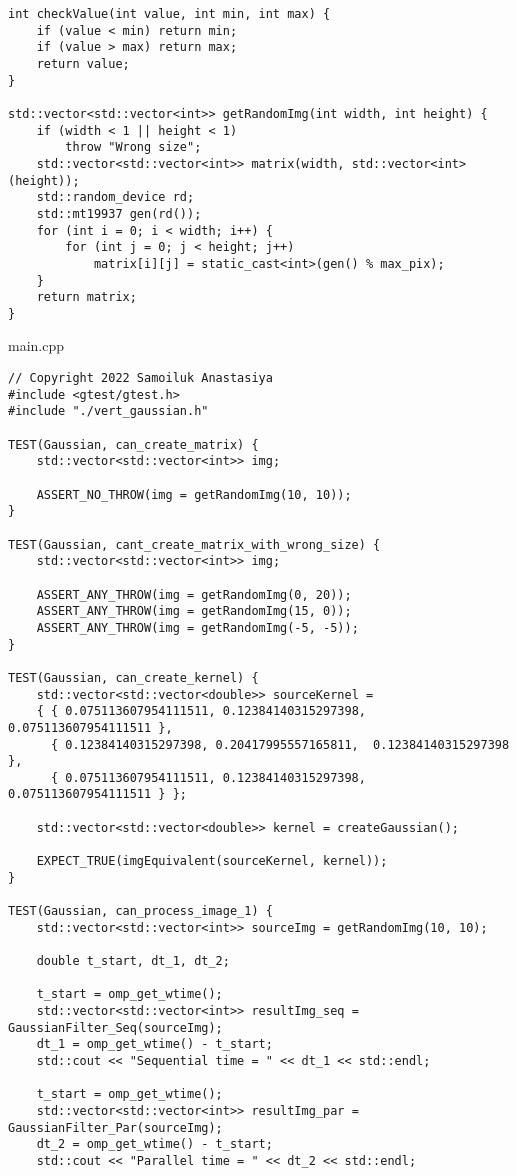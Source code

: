 \documentclass{report}
\begin{document}
\begin{lstlisting}
int checkValue(int value, int min, int max) {
    if (value < min) return min;
    if (value > max) return max;
    return value;
}

std::vector<std::vector<int>> getRandomImg(int width, int height) {
    if (width < 1 || height < 1)
        throw "Wrong size";
    std::vector<std::vector<int>> matrix(width, std::vector<int>(height));
    std::random_device rd;
    std::mt19937 gen(rd());
    for (int i = 0; i < width; i++) {
        for (int j = 0; j < height; j++)
            matrix[i][j] = static_cast<int>(gen() % max_pix);
    }
    return matrix;
}
\end{lstlisting}
\par main.cpp
\begin{lstlisting}
// Copyright 2022 Samoiluk Anastasiya
#include <gtest/gtest.h>
#include "./vert_gaussian.h"

TEST(Gaussian, can_create_matrix) {
    std::vector<std::vector<int>> img;

    ASSERT_NO_THROW(img = getRandomImg(10, 10));
}

TEST(Gaussian, cant_create_matrix_with_wrong_size) {
    std::vector<std::vector<int>> img;

    ASSERT_ANY_THROW(img = getRandomImg(0, 20));
    ASSERT_ANY_THROW(img = getRandomImg(15, 0));
    ASSERT_ANY_THROW(img = getRandomImg(-5, -5));
}

TEST(Gaussian, can_create_kernel) {
    std::vector<std::vector<double>> sourceKernel =
    { { 0.075113607954111511, 0.12384140315297398, 0.075113607954111511 },
      { 0.12384140315297398, 0.20417995557165811,  0.12384140315297398 },
      { 0.075113607954111511, 0.12384140315297398, 0.075113607954111511 } };

    std::vector<std::vector<double>> kernel = createGaussian();

    EXPECT_TRUE(imgEquivalent(sourceKernel, kernel));
}

TEST(Gaussian, can_process_image_1) {
    std::vector<std::vector<int>> sourceImg = getRandomImg(10, 10);

    double t_start, dt_1, dt_2;

    t_start = omp_get_wtime();
    std::vector<std::vector<int>> resultImg_seq = GaussianFilter_Seq(sourceImg);
    dt_1 = omp_get_wtime() - t_start;
    std::cout << "Sequential time = " << dt_1 << std::endl;

    t_start = omp_get_wtime();
    std::vector<std::vector<int>> resultImg_par = GaussianFilter_Par(sourceImg);
    dt_2 = omp_get_wtime() - t_start;
    std::cout << "Parallel time = " << dt_2 << std::endl;


\end{lstlisting}
\end{document}
